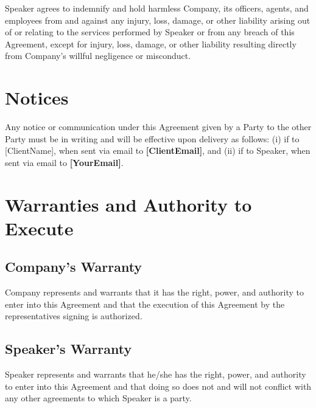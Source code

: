 \documentclass[a4paper,12pt]{article} %
\newcommand{\YourEmail}{[YourEmail]}
\newcommand{\ClientName}{[ClientName]}
\newcommand{\ClientEmail}{[ClientEmail]}
\begin{document}
Speaker agrees to indemnify and hold harmless Company, its officers, agents, and employees from and against any injury, loss, damage, or other liability arising out of or relating to the services performed by Speaker or from any breach of this Agreement, except for injury, loss, damage, or other liability resulting directly from Company's willful negligence or misconduct.


\section{Notices}

Any notice or communication under this Agreement given by a Party to the other Party must be in writing and will be effective upon delivery as follows: (i) if to \ClientName, when sent via email to \textbf{\ClientEmail}, and (ii) if to Speaker, when sent via email to \textbf{\YourEmail}.


\section{Warranties and Authority to Execute}

\subsection{Company's Warranty}

Company represents and warrants that it has the right, power, and authority to enter into this Agreement and that the execution of this Agreement by the representatives signing is authorized.

\subsection{Speaker's Warranty}

Speaker represents and warrants that he/she has the right, power, and authority to enter into this Agreement and that doing so does not and will not conflict with any other agreements to which Speaker is a party.
\end{document}
